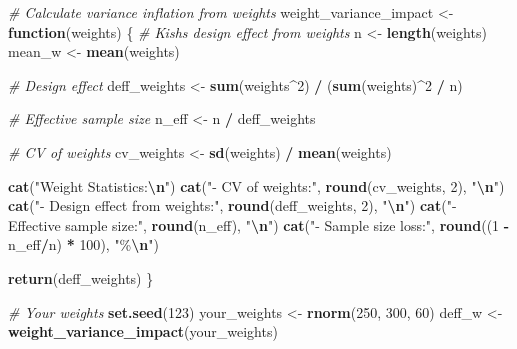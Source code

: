 \documentclass[
]{article}
\newenvironment{Shaded}{\begin{snugshade}}{\end{snugshade}}
\newcommand{\CommentTok}[1]{\textcolor[rgb]{0.56,0.35,0.01}{\textit{#1}}}
\newcommand{\ControlFlowTok}[1]{\textcolor[rgb]{0.13,0.29,0.53}{\textbf{#1}}}
\newcommand{\DecValTok}[1]{\textcolor[rgb]{0.00,0.00,0.81}{#1}}
\newcommand{\FunctionTok}[1]{\textcolor[rgb]{0.13,0.29,0.53}{\textbf{#1}}}
\newcommand{\NormalTok}[1]{#1}
\newcommand{\OtherTok}[1]{\textcolor[rgb]{0.56,0.35,0.01}{#1}}
\newcommand{\SpecialCharTok}[1]{\textcolor[rgb]{0.81,0.36,0.00}{\textbf{#1}}}
\newcommand{\StringTok}[1]{\textcolor[rgb]{0.31,0.60,0.02}{#1}}
\begin{document}
\begin{Shaded}
\begin{Highlighting}[]
\CommentTok{\# Calculate variance inflation from weights}
\NormalTok{weight\_variance\_impact }\OtherTok{\textless{}{-}} \ControlFlowTok{function}\NormalTok{(weights) \{}
  \CommentTok{\# Kish\textquotesingle{}s design effect from weights}
\NormalTok{  n }\OtherTok{\textless{}{-}} \FunctionTok{length}\NormalTok{(weights)}
\NormalTok{  mean\_w }\OtherTok{\textless{}{-}} \FunctionTok{mean}\NormalTok{(weights)}
  
  \CommentTok{\# Design effect}
\NormalTok{  deff\_weights }\OtherTok{\textless{}{-}} \FunctionTok{sum}\NormalTok{(weights}\SpecialCharTok{\^{}}\DecValTok{2}\NormalTok{) }\SpecialCharTok{/}\NormalTok{ (}\FunctionTok{sum}\NormalTok{(weights)}\SpecialCharTok{\^{}}\DecValTok{2} \SpecialCharTok{/}\NormalTok{ n)}
  
  \CommentTok{\# Effective sample size}
\NormalTok{  n\_eff }\OtherTok{\textless{}{-}}\NormalTok{ n }\SpecialCharTok{/}\NormalTok{ deff\_weights}
  
  \CommentTok{\# CV of weights}
\NormalTok{  cv\_weights }\OtherTok{\textless{}{-}} \FunctionTok{sd}\NormalTok{(weights) }\SpecialCharTok{/} \FunctionTok{mean}\NormalTok{(weights)}
  
  \FunctionTok{cat}\NormalTok{(}\StringTok{"Weight Statistics:}\SpecialCharTok{\textbackslash{}n}\StringTok{"}\NormalTok{)}
  \FunctionTok{cat}\NormalTok{(}\StringTok{"{-} CV of weights:"}\NormalTok{, }\FunctionTok{round}\NormalTok{(cv\_weights, }\DecValTok{2}\NormalTok{), }\StringTok{"}\SpecialCharTok{\textbackslash{}n}\StringTok{"}\NormalTok{)}
  \FunctionTok{cat}\NormalTok{(}\StringTok{"{-} Design effect from weights:"}\NormalTok{, }\FunctionTok{round}\NormalTok{(deff\_weights, }\DecValTok{2}\NormalTok{), }\StringTok{"}\SpecialCharTok{\textbackslash{}n}\StringTok{"}\NormalTok{)}
  \FunctionTok{cat}\NormalTok{(}\StringTok{"{-} Effective sample size:"}\NormalTok{, }\FunctionTok{round}\NormalTok{(n\_eff), }\StringTok{"}\SpecialCharTok{\textbackslash{}n}\StringTok{"}\NormalTok{)}
  \FunctionTok{cat}\NormalTok{(}\StringTok{"{-} Sample size loss:"}\NormalTok{, }\FunctionTok{round}\NormalTok{((}\DecValTok{1} \SpecialCharTok{{-}}\NormalTok{ n\_eff}\SpecialCharTok{/}\NormalTok{n) }\SpecialCharTok{*} \DecValTok{100}\NormalTok{), }\StringTok{"\%}\SpecialCharTok{\textbackslash{}n}\StringTok{"}\NormalTok{)}
  
  \FunctionTok{return}\NormalTok{(deff\_weights)}
\NormalTok{\}}

\CommentTok{\# Your weights}
\FunctionTok{set.seed}\NormalTok{(}\DecValTok{123}\NormalTok{)}
\NormalTok{your\_weights }\OtherTok{\textless{}{-}} \FunctionTok{rnorm}\NormalTok{(}\DecValTok{250}\NormalTok{, }\DecValTok{300}\NormalTok{, }\DecValTok{60}\NormalTok{)}
\NormalTok{deff\_w }\OtherTok{\textless{}{-}} \FunctionTok{weight\_variance\_impact}\NormalTok{(your\_weights)}
\end{Highlighting}
\end{Shaded}
\end{document}
